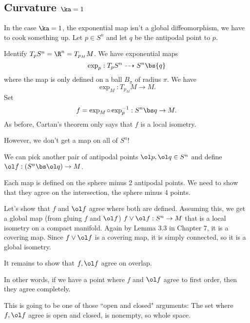 \subsection{Curvature $\ka=1$}
In the case $\ka=1$, the exponential map isn't a global diffeomorphism, we have to cook something up. Let $p\in S^n$ and let $q$ be the antipodal point to $p$. 


Identify $T_pS^n=\R^n=T_{p_M}M$. We have exponential maps
\[
\exp_p:T_pS^n \dashrightarrow S^n\bs \{q\}
\]
where the map is only defined on a ball $B_{\pi}$ of radius $\pi$. We have 
\[
\exp_M:T_{p_M}M\to M.
\]
Set 
\[
f=\exp_M\circ \exp_p^{-1}: S^n\bs q\to M.
\]
As before, Cartan's theorem only says that $f$ is a local isometry.

However, we don't get a map on all of $S^n$!

We can pick another pair of antipodal points $\ol p,\ol q\in S^n$ and define $\ol f:(S^n\bs \ol q)\to M$. 

Each map is defined on the sphere minus 2 antipodal points. We need to show that they agree on the intersection, the sphere minus 4 points. %

Let's show that $f$ and $\ol f$ agree where both are defined. Assuming this, we get a global map (from gluing $f$ and $\ol f$) $f\vee \ol f:S^n\to M$ that is a local isometry on a compact manifold. 
Again by Lemma 3.3 in Chapter 7, it is a covering map. 
Since  $f\vee \ol f$ is a covering map, it is simply connected, so it is a global isometry.

It remains to show that $f,\ol f$ agree on overlap.
In other words, if we have a point where $f$ and $\ol f$ agree to first order, then they agree completely.

This is going to be one of those ``open and closed" arguments: The set where $f,\ol f$ agree is open and closed, is nonempty, so whole space.

